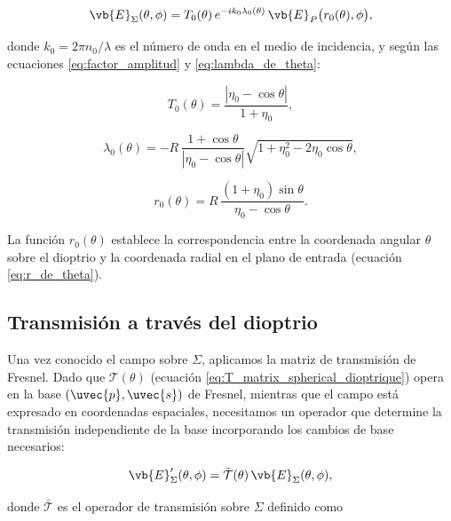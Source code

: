 \begin{equation}
\vb{E}_\Sigma(\theta,\phi) = T_0(\theta)\, e^{-i k_0 \lambda_0(\theta)}\, \vb{E}_P\bigl(r_0(\theta), \phi\bigr),
\label{eq:transferencia_plano_a_sigma}
\end{equation}

donde $k_0 = 2\pi n_0/\lambda$ es el número de onda en el medio de incidencia, y según las ecuaciones \eqref{eq:factor_amplitud} y \eqref{eq:lambda_de_theta}:

\begin{equation}
T_0(\theta) = \frac{|\eta_0 - \cos\theta|}{1 + \eta_0},
\label{eq:T0_definicion}
\end{equation}

\begin{equation}
\lambda_0(\theta) = -R\,\frac{1+\cos\theta}{|\eta_0-\cos\theta|}
\sqrt{1+\eta_0^2 - 2\eta_0\cos\theta},
\label{eq:lambda0_definicion}
\end{equation}

\begin{equation}
r_0(\theta) = R\,\frac{(1+\eta_0)\sin\theta}{\eta_0 - \cos\theta}.
\label{eq:r0_proyeccion}
\end{equation}

La función $r_0(\theta)$ establece la correspondencia entre la coordenada angular $\theta$ sobre el dioptrio y la coordenada radial en el plano de entrada (ecuación \eqref{eq:r_de_theta}).

\subsection{Transmisión a través del dioptrio}

Una vez conocido el campo sobre $\Sigma$, aplicamos la matriz de transmisión de Fresnel. Dado que $\mathcal{T}(\theta)$ (ecuación \eqref{eq:T_matrix_spherical_dioptrique}) opera en la base $(\uvec{p}, \uvec{s})$ de Fresnel, mientras que el campo está expresado en coordenadas espaciales, necesitamos un operador que determine la transmisión independiente de la base incorporando los cambios de base necesarios:

\begin{equation}
\vb{E}'_\Sigma(\theta,\phi) = \bar{\mathcal{T}}(\theta)\, \vb{E}_\Sigma(\theta,\phi),
\label{eq:transmision_fresnel_sigma}
\end{equation}

donde $\bar{\mathcal{T}}$ es el operador de transmisión sobre $\Sigma$ definido como 

